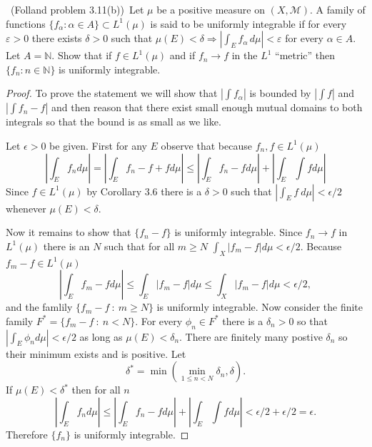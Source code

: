 \documentclass[11pt]{amsart}
\theoremstyle{definition}
\numberwithin{theorem}{section}
\numberwithin{definition}{section}
\numberwithin{equation}{section}
\def\naturals{{\mathbb N}}
\def\eps{\varepsilon}
\def\scriptm{{\mathcal M}}
\begin{document}
\medskip {}\ (Folland problem 3.11(b))\ 
Let $\mu$ be a positive measure on $(X,\scriptm)$.
A family of functions $\{f_\alpha: \alpha\in A\}\subset L^1(\mu)$
is said to be uniformly integrable if for every $\eps>0$
there exists $\delta>0$ such that $\mu(E)<\delta
\Rightarrow |\int_E f_\alpha\,d\mu|<\eps$ for every $\alpha\in A$.
Let $A=\naturals$.
Show that if $f\in L^1(\mu)$ and if $f_n\to f$ in the $L^1$ ``metric''
then $\{f_n: n\in\naturals\}$ is uniformly integrable.
\begin{proof}
	To prove the statement we will show that $|\int f_\alpha|$ is bounded by
	$|\int f|$ and $|\int f_n -f|$ and then reason that there exist small enough mutual domains to both integrals so that 
	the bound is as small as we like.

	Let $\epsilon > 0$ be given.
	First for any $E$ observe that because $f_n, f \in L^1(\mu)$ 
	\begin{equation*}
		\left|\int_E f_n d\mu\right| = \left|\int_E f_n -f + f d\mu\right| \leq \left|\int_E f_n -f d\mu\right| + \left|\int_E  \int f d\mu\right|
	\end{equation*}
	Since $f \in L^1(\mu)$ by Corollary 3.6 there is a $\delta > 0$ such that $|\int_E f\ d\mu| < \epsilon/2$ whenever $\mu(E) < \delta$. 

	Now it remains to show that $\{f_n -f\}$ is uniformly integrable. Since $f_n \to f$ in $L^1(\mu)$ there is an $N$ such that
	for all $m \geq N$ $\int_X |f_m - f| d\mu < \epsilon/2$. Because $f_m - f \in L^1(\mu)$
	\begin{equation*}
		\left|\int_E f_m -f d\mu\right| \leq\int_E \left| f_m - f\right| d\mu \leq\int_X \left| f_m  -f \right| d\mu < \epsilon/2,
	\end{equation*}
	and the famlily  $\{f_m -f\ :\ m \geq N\}$ is uniformly integrable. Now consider the finite family $F^* = \{f_m -f\ :\ n < N\}$. For every $\phi_n \in F^*$ there is a $\delta_n > 0$ so that $|\int_E \phi_n d\mu| < \epsilon/2$ as long as $\mu(E) < \delta_n$. There are finitely many postive $\delta_n$ so their minimum exists and is positive. Let
	\begin{equation*}
		\delta^* = \min\left( \min_{1 \leq n < N} \delta_n, \delta\right).
	\end{equation*}
	If $\mu(E) < \delta^*$ then for all $n$
	\begin{equation*}
		\left|\int_E f_n d\mu\right| \leq \left|\int_E f_n -f d\mu\right| + \left|\int_E  \int f d\mu\right| < \epsilon/2 + \epsilon/2 = \epsilon.
	\end{equation*}
	Therefore $\{f_n\}$ is uniformly integrable.
\end{proof}
\end{document}
